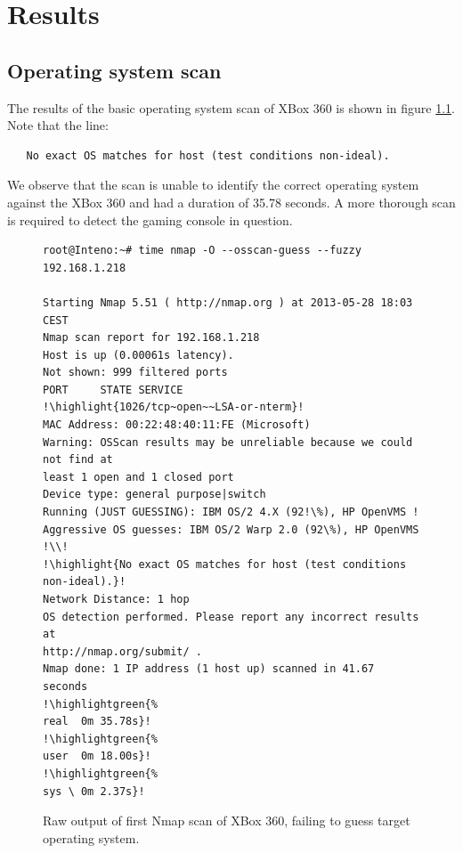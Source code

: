 \documentclass[a4paper,11pt,makeidx]{kth-bcs}
\newcommand{\reducedstrut}{\vrule width 0pt height .9\ht\strutbox depth .9\dp\strutbox\relax}
\newcommand{\highlight}[1]{%
  \begingroup
  \colorbox{light-gray!20}{\footnotesize\ttfamily#1\/}%
  \endgroup
}
\newcommand{\highlightgreen}[1]{%
  \begingroup
  \colorbox{light-green!20}{#1\/}%
  \endgroup
}
\begin{document}

\chapter{Results}
\section{Operating system scan}
The results of the basic operating system scan of XBox 360 is shown in figure \ref{fig:nmapos}.
Note that the line:
\begin{verbatim}
   No exact OS matches for host (test conditions non-ideal).
\end{verbatim}
    
We observe that the scan is unable to identify the correct operating system against the XBox 360 and had a duration of 35.78 seconds.
A more thorough scan is required to detect the gaming console in question.

   \begin{figure}[h!]
      \centering
      \begin{lstlisting}[escapechar=!]
root@Inteno:~# time nmap -O --osscan-guess --fuzzy 192.168.1.218

Starting Nmap 5.51 ( http://nmap.org ) at 2013-05-28 18:03 CEST
Nmap scan report for 192.168.1.218
Host is up (0.00061s latency).
Not shown: 999 filtered ports
PORT     STATE SERVICE
!\highlight{1026/tcp~open~~LSA-or-nterm}!
MAC Address: 00:22:48:40:11:FE (Microsoft)
Warning: OSScan results may be unreliable because we could not find at
least 1 open and 1 closed port
Device type: general purpose|switch
Running (JUST GUESSING): IBM OS/2 4.X (92!\%), HP OpenVMS !
Aggressive OS guesses: IBM OS/2 Warp 2.0 (92\%), HP OpenVMS !\\!
!\highlight{No exact OS matches for host (test conditions non-ideal).}!
Network Distance: 1 hop
OS detection performed. Please report any incorrect results at
http://nmap.org/submit/ .
Nmap done: 1 IP address (1 host up) scanned in 41.67 seconds
!\highlightgreen{%
real  0m 35.78s}!
!\highlightgreen{%
user  0m 18.00s}!
!\highlightgreen{%
sys \ 0m 2.37s}!
      \end{lstlisting}
      \caption{
         \small{
Raw output of first Nmap scan of XBox 360, failing to guess target operating system.
         }
      }
      \label{fig:nmapos}
   \end{figure}
\end{document}
